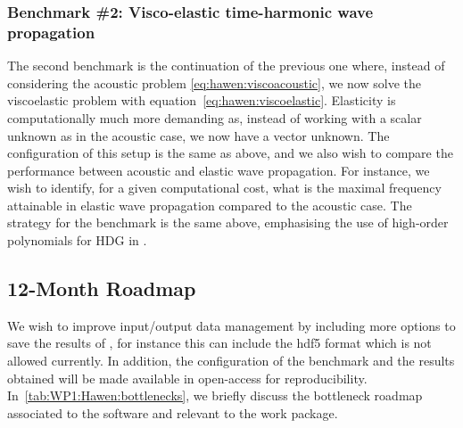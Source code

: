 \subsubsection{Benchmark \#2: Visco-elastic time-harmonic wave propagation}

The second benchmark is the continuation of the previous one where, instead 
of considering the acoustic problem \cref{eq:hawen:viscoacoustic}, we now
solve the viscoelastic problem with equation~\cref{eq:hawen:viscoelastic}.
Elasticity is computationally much more demanding as, instead of working with
a scalar unknown as in the acoustic case, we now have a vector unknown. 
The configuration of this setup is the same as above, and we also wish to 
compare the performance between acoustic and elastic wave propagation. 
For instance, we wish to identify, for a given computational cost, what 
is the maximal frequency attainable in elastic wave propagation compared to
the acoustic case.
The strategy for the benchmark is the same above, emphasising the use of 
high-order polynomials for HDG in \hawen.


\subsection{12-Month Roadmap}
\label{sec:WP1:Hawen:roadmap}



We wish to improve input/output data management by including more options 
to save the results of \hawen, for instance this can include the hdf5 format
which is not allowed currently.
In addition, the configuration of the benchmark and the results obtained will 
be made available in open-access for reproducibility.
In~\cref{tab:WP1:Hawen:bottlenecks}, we briefly discuss the bottleneck roadmap associated to the software and relevant to the work package.

